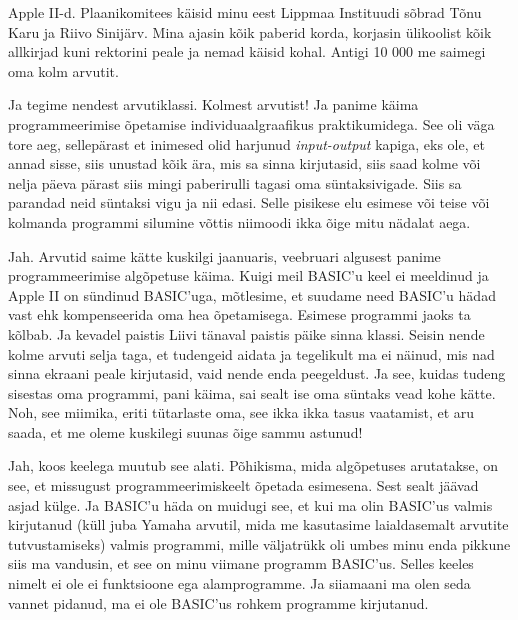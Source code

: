 
Apple II-d. Plaanikomitees käisid minu eest Lippmaa 
Instituudi sõbrad Tõnu Karu ja Riivo 
Sinijärv. Mina ajasin kõik paberid korda, korjasin 
ülikoolist kõik allkirjad kuni rektorini peale ja nemad käisid kohal. Antigi 10 
000 me saimegi oma kolm arvutit.

Ja tegime nendest arvutiklassi. Kolmest arvutist! Ja panime käima 
programmeerimise õpetamise individuaalgraafikus praktikumidega. See oli väga 
tore aeg, sellepärast et inimesed olid harjunud \emph{input-output} kapiga, eks 
ole, et annad sisse, siis unustad kõik ära, mis sa sinna kirjutasid, siis saad 
kolme või nelja päeva pärast siis mingi paberirulli tagasi oma süntaksivigade. 
Siis sa parandad neid süntaksi vigu ja nii edasi. Selle pisikese elu esimese 
või teise või kolmanda programmi silumine võttis niimoodi ikka õige mitu 
nädalat aega. 


Jah. Arvutid saime kätte kuskilgi jaanuaris, veebruari algusest panime  
programmeerimise algõpetuse käima. Kuigi meil BASIC'u keel ei 
meeldinud ja Apple II on sündinud BASIC'uga, mõtlesime, et 
suudame need BASIC'u hädad vast ehk kompenseerida oma hea õpetamisega. Esimese 
programmi jaoks ta kõlbab. Ja kevadel paistis Liivi tänaval paistis päike sinna klassi. Seisin nende kolme arvuti 
selja taga, et tudengeid aidata ja tegelikult ma ei näinud, mis nad sinna 
ekraani peale kirjutasid, vaid nende enda peegeldust. Ja see, kuidas tudeng 
sisestas oma programmi, pani käima, sai sealt ise oma süntaks vead kohe kätte. 
Noh, see miimika, eriti tütarlaste oma, see ikka ikka tasus vaatamist, et aru 
saada, et me oleme kuskilegi suunas õige sammu astunud! 


Jah, koos keelega muutub see alati. Põhikisma, mida algõpetuses arutatakse, on 
see, et missugust programmeerimiskeelt õpetada esimesena. Sest sealt jäävad 
asjad külge. Ja BASIC'u häda on muidugi see, et kui ma olin BASIC'us 
valmis kirjutanud (küll juba Yamaha arvutil, mida me kasutasime  laialdasemalt 
arvutite tutvustamiseks) valmis programmi, mille väljatrükk oli umbes minu enda 
pikkune siis ma vandusin, et see on minu viimane programm BASIC'us. Selles keeles 
nimelt ei ole ei funktsioone ega alamprogramme. Ja siiamaani ma olen seda 
vannet pidanud, ma ei ole BASIC'us rohkem programme kirjutanud. 


